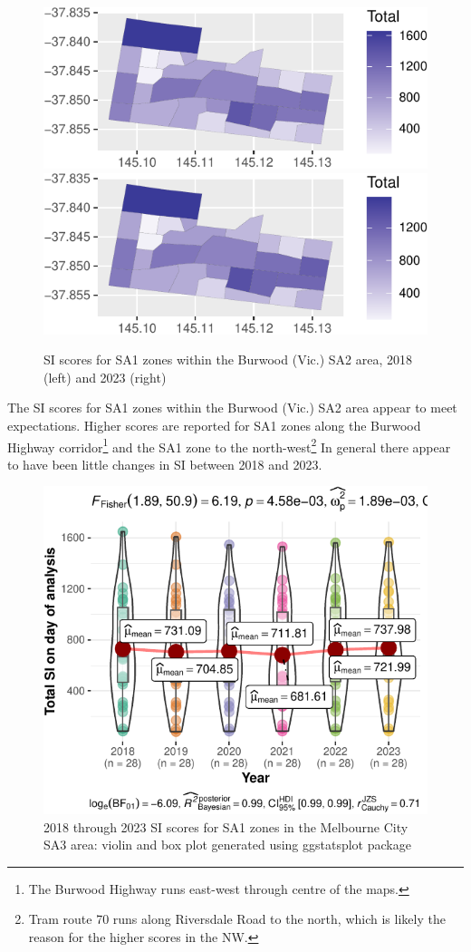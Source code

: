 \documentclass[]{tufte-book}
\begin{document}
\begin{figure}
\includegraphics[width=0.5\linewidth]{Reynolds_Currie_2024_transit_supply_index_GTFS_files/figure-latex/Burwood_SI-1} \includegraphics[width=0.5\linewidth]{Reynolds_Currie_2024_transit_supply_index_GTFS_files/figure-latex/Burwood_SI-2} \caption[SI scores for SA1 zones within the Burwood (Vic.) SA2 area, 2018 (left) and 2023 (right)]{SI scores for SA1 zones within the Burwood (Vic.) SA2 area, 2018 (left) and 2023 (right)}\label{fig:Burwood_SI}
\end{figure}

The SI scores for SA1 zones within the Burwood (Vic.) SA2 area appear to
meet expectations. Higher scores are reported for SA1 zones along the
Burwood Highway corridor\footnote{The Burwood Highway runs east-west
  through centre of the maps.} and the SA1 zone to the
north-west\footnote{Tram route 70 runs along Riversdale Road to the
  north, which is likely the reason for the higher scores in the NW.} In
general there appear to have been little changes in SI between 2018 and
2023.

\begin{figure}
\includegraphics{Reynolds_Currie_2024_transit_supply_index_GTFS_files/figure-latex/Compare_2018_2023_Burwood_within_stats-1} \caption[2018 through 2023 SI scores for SA1 zones in the Melbourne City SA3 area]{2018 through 2023 SI scores for SA1 zones in the Melbourne City SA3 area: violin and box plot generated using ggstatsplot package}\label{fig:Compare_2018_2023_Burwood_within_stats}
\end{figure}
\end{document}
